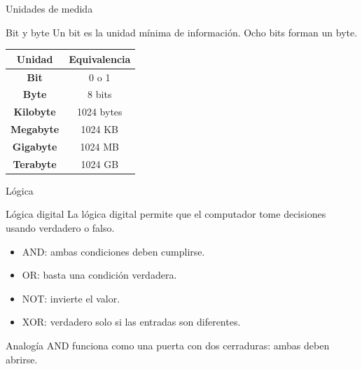 \documentclass[10pt, aspectratio=169]{beamer}
\begin{document}
	\begin{frame}{Unidades de medida}
		
		\small
		
		\begin{block}{Bit y byte}
			Un bit es la unidad mínima de información. Ocho bits forman un byte.
		\end{block}
		
		\vspace{0.3cm}
		
		\begin{center}
			
			\begin{tabular}{>{\bfseries}c c}
				
				\toprule
				Unidad & Equivalencia \\
				\midrule
				Bit & 0 o 1 \\
				Byte & 8 bits \\
				Kilobyte & 1024 bytes \\
				Megabyte & 1024 KB \\
				Gigabyte & 1024 MB \\
				Terabyte & 1024 GB \\
				\bottomrule
				
			\end{tabular}
			
		\end{center}
		
	\end{frame}
	
	\begin{frame}{Lógica}
		
		\begin{block}{Lógica digital}
			La lógica digital permite que el computador tome decisiones usando verdadero o falso.
		\end{block}
		
		\begin{itemize}
			\item AND: ambas condiciones deben cumplirse.
			\item OR: basta una condición verdadera.
			\item NOT: invierte el valor.
			\item XOR: verdadero solo si las entradas son diferentes.
		\end{itemize}
		
		\vspace{0.3cm}
		
		\begin{block}{Analogía}
			AND funciona como una puerta con dos cerraduras: ambas deben abrirse.
		\end{block}
		
	\end{frame}
	
\end{document}
